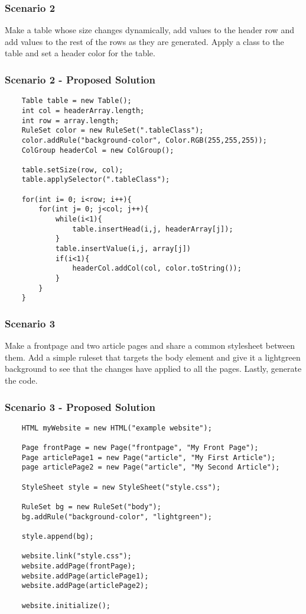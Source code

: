 \documentclass[12pt]{article}
\begin{document}
\subsubsection{Scenario 2}
Make a table whose size changes dynamically, add values to the header row and add values to the rest of the rows as they are generated. Apply a class to the table and set a header color for the table.

\subsubsection{Scenario 2 - Proposed Solution}

\begin{lstlisting}
    Table table = new Table();
    int col = headerArray.length;
    int row = array.length;
    RuleSet color = new RuleSet(".tableClass");
    color.addRule("background-color", Color.RGB(255,255,255));
    ColGroup headerCol = new ColGroup();

    table.setSize(row, col);
    table.applySelector(".tableClass");

    for(int i= 0; i<row; i++){
        for(int j= 0; j<col; j++){
            while(i<1){
                table.insertHead(i,j, headerArray[j]);
            }
            table.insertValue(i,j, array[j])
            if(i<1){
                headerCol.addCol(col, color.toString());
            }
        }
    }
\end{lstlisting}

\subsubsection{Scenario 3}
Make a frontpage and two article pages and share a common stylesheet between them. Add a simple ruleset that targets the body element and give it a lightgreen background to see that the changes have applied to all the pages. Lastly, generate the code.

\subsubsection{Scenario 3 - Proposed Solution}

\begin{lstlisting}
    HTML myWebsite = new HTML("example website");
    
    Page frontPage = new Page("frontpage", "My Front Page");
    Page articlePage1 = new Page("article", "My First Article");
    page articlePage2 = new Page("article", "My Second Article");

    StyleSheet style = new StyleSheet("style.css");

    RuleSet bg = new RuleSet("body");
    bg.addRule("background-color", "lightgreen");

    style.append(bg);

    website.link("style.css");
    website.addPage(frontPage);
    website.addPage(articlePage1);
    website.addPage(articlePage2);

    website.initialize();
\end{lstlisting}
\end{document}

